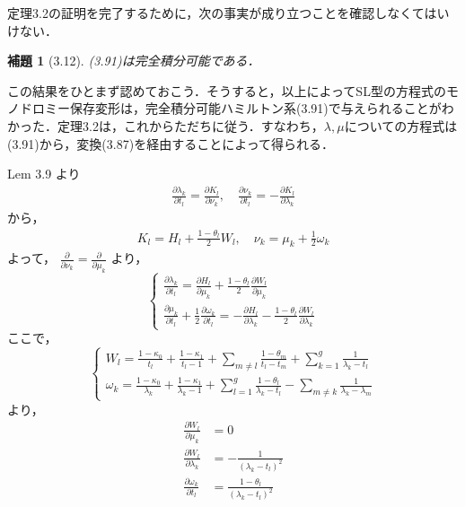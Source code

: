 \documentclass[paper=a4, fontsize=11pt]{jlreq} %
\newenvironment{story}{%
  \begin{mdframed}[
    backgroundcolor=red!5, %
    linewidth=0pt,         %
    innertopmargin=10pt,   %
    innerbottommargin=10pt,
    innerrightmargin=10pt, %
    innerleftmargin=10pt
  ]%
}{%
  \end{mdframed}%
}
\theoremstyle{break}
\newtheorem{lemma}[theorem]{補題}
\theoremstyle{qa}
\begin{document}
\begin{story}
定理3.2の証明を完了するために，次の事実が成り立つことを確認しなくてはいけない．

\begin{lemma}[3.12]
(3.91)は完全積分可能である．
\end{lemma}

この結果をひとまず認めておこう．そうすると，以上によってSL型の方程式のモノドロミー保存変形は，完全積分可能ハミルトン系(3.91)で与えられることがわかった．定理3.2は，これからただちに従う．すなわち，$\lambda, \mu$についての方程式は(3.91)から，変換(3.87)を経由することによって得られる．
\end{story}
Lem 3.9 より
\begin{align*}
    \frac{\partial \lambda_k}{\partial t_l} = \frac{\partial K_l}{\partial \nu_k}, \quad \frac{\partial \nu_k}{\partial t_l} = - \frac{\partial K_l}{\partial \lambda_k}
\end{align*}
から，
\begin{align*}
    K_l = H_l + \frac{1-\theta_l}{2} W_l, \quad \nu_k = \mu_k + \frac{1}{2} \omega_k
\end{align*}
よって， $\displaystyle \frac{\partial}{\partial \nu_k} = \frac{\partial}{\partial \mu_k}$ より，
\[
\begin{cases}
    \displaystyle \frac{\partial \lambda_k}{\partial t_l} = \frac{\partial H_l}{\partial \mu_k} + \frac{1-\theta_l}{2} \frac{\partial W_l}{\partial \mu_k} \\
    \displaystyle \frac{\partial \mu_k}{\partial t_l} + \frac{1}{2} \frac{\partial \omega_k}{\partial t_l} = - \frac{\partial H_l}{\partial \lambda_k} - \frac{1-\theta_l}{2} \frac{\partial W_l}{\partial \lambda_k}
\end{cases}
\]
ここで，
\[
\begin{cases}
    \displaystyle W_l = \frac{1-\kappa_0}{t_l} + \frac{1-\kappa_1}{t_l-1} + \sum_{m \neq l} \frac{1-\theta_m}{t_l-t_m} + \sum_{k=1}^g \frac{1}{\lambda_k-t_l} \\
    \displaystyle \omega_k = \frac{1-\kappa_0}{\lambda_k} + \frac{1-\kappa_1}{\lambda_k-1} + \sum_{l=1}^g \frac{1-\theta_l}{\lambda_k-t_l} - \sum_{m \neq k} \frac{1}{\lambda_k-\lambda_m}
\end{cases}
\]
より，
\begin{align*}
    \frac{\partial W_l}{\partial \mu_k} &= 0 \\
    \frac{\partial W_l}{\partial \lambda_k} &= - \frac{1}{(\lambda_k-t_l)^2} \\
    \frac{\partial \omega_k}{\partial t_l} &= \frac{1-\theta_l}{(\lambda_k-t_l)^2}
\end{align*}
\end{document}
